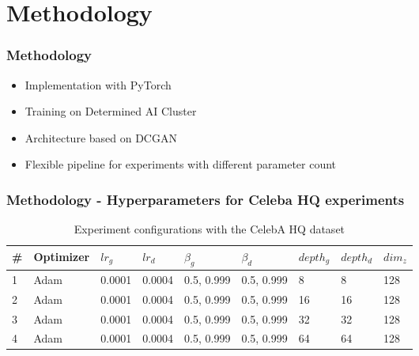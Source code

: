\section{Methodology}

\begin{frame}
    \frametitle{Methodology}

    \begin{center}
        \begin{itemize}
            \item Implementation with PyTorch
            \item Training on Determined AI Cluster
            \item Architecture based on DCGAN \cite{radford2016dcgan}
            \item Flexible pipeline for experiments with different parameter count
        \end{itemize}
    \end{center}
\end{frame}

\begin{frame}
    \frametitle{Methodology - Hyperparameters for Celeba HQ experiments}

    \begin{center}
        \begin{table}[H]
            \centering
            \tiny
            \begin{tabular}{@{}lllllllll@{}}
            \toprule
            \# & Optimizer & $ lr_{g} $ & $ lr_{d} $ & $ \beta_{g} $ & $ \beta_{d} $ & $ depth_{g} $ & $ depth_{d} $ & $ dim_{z} $ \\ \midrule
            1 & Adam & 0.0001 & 0.0004 & 0.5, 0.999 & 0.5, 0.999 & 8  & 8  & 128 \\
            2 & Adam & 0.0001 & 0.0004 & 0.5, 0.999 & 0.5, 0.999 & 16 & 16 & 128 \\
            3 & Adam & 0.0001 & 0.0004 & 0.5, 0.999 & 0.5, 0.999 & 32 & 32 & 128 \\
            4 & Adam & 0.0001 & 0.0004 & 0.5, 0.999 & 0.5, 0.999 & 64 & 64 & 128 \\ \bottomrule
            \end{tabular}
            \caption{Experiment configurations with the CelebA HQ dataset}
        \label{tab:experiments_celeba_hq}
        \end{table}

    \end{center}
\end{frame}

